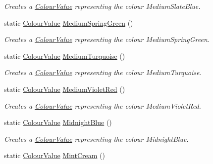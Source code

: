 \begin{DoxyCompactItemize}
\begin{DoxyCompactList}\small\item\em Creates a \hyperlink{classMezzanine_1_1ColourValue}{ColourValue} representing the colour MediumSlateBlue. \item\end{DoxyCompactList}\item 
static \hyperlink{classMezzanine_1_1ColourValue}{ColourValue} \hyperlink{classMezzanine_1_1ColourValue_af031c08f78b1fe510a9db40c84566fa5}{MediumSpringGreen} ()
\begin{DoxyCompactList}\small\item\em Creates a \hyperlink{classMezzanine_1_1ColourValue}{ColourValue} representing the colour MediumSpringGreen. \item\end{DoxyCompactList}\item 
static \hyperlink{classMezzanine_1_1ColourValue}{ColourValue} \hyperlink{classMezzanine_1_1ColourValue_a9d03e4cfb4b370a3d8c59469eaa270ed}{MediumTurquoise} ()
\begin{DoxyCompactList}\small\item\em Creates a \hyperlink{classMezzanine_1_1ColourValue}{ColourValue} representing the colour MediumTurquoise. \item\end{DoxyCompactList}\item 
static \hyperlink{classMezzanine_1_1ColourValue}{ColourValue} \hyperlink{classMezzanine_1_1ColourValue_aca3b453e8d697d623480acfe6f1d129d}{MediumVioletRed} ()
\begin{DoxyCompactList}\small\item\em Creates a \hyperlink{classMezzanine_1_1ColourValue}{ColourValue} representing the colour MediumVioletRed. \item\end{DoxyCompactList}\item 
static \hyperlink{classMezzanine_1_1ColourValue}{ColourValue} \hyperlink{classMezzanine_1_1ColourValue_a7745c36427791ed5beea5a653efc6ee8}{MidnightBlue} ()
\begin{DoxyCompactList}\small\item\em Creates a \hyperlink{classMezzanine_1_1ColourValue}{ColourValue} representing the colour MidnightBlue. \item\end{DoxyCompactList}\item 
static \hyperlink{classMezzanine_1_1ColourValue}{ColourValue} \hyperlink{classMezzanine_1_1ColourValue_ac0e1aca39cf5d61f7a48fb02a318c59f}{MintCream} ()

\end{DoxyCompactItemize}

